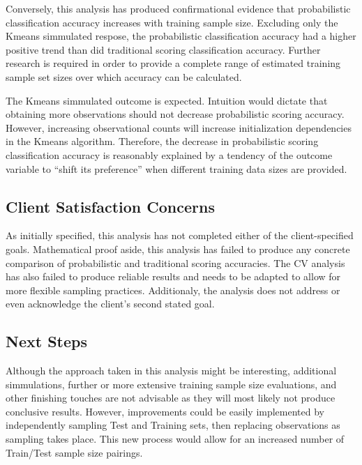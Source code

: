 \documentclass[12pt,]{article}
\begin{document}
Conversely, this analysis has produced confirmational evidence that
probabilistic classification accuracy increases with training sample
size. Excluding only the Kmeans simmulated respose, the probabilistic
classification accuracy had a higher positive trend than did traditional
scoring classification accuracy. Further research is required in order
to provide a complete range of estimated training sample set sizes over
which accuracy can be calculated.

The Kmeans simmulated outcome is expected. Intuition would dictate that
obtaining more observations should not decrease probabilistic scoring
accuracy. However, increasing observational counts will increase
initialization dependencies in the Kmeans algorithm. Therefore, the
decrease in probabilistic scoring classification accuracy is reasonably
explained by a tendency of the outcome variable to ``shift its
preference'' when different training data sizes are provided.

\hypertarget{client-satisfaction-concerns}{%
\subsection{Client Satisfaction
Concerns}\label{client-satisfaction-concerns}}

As initially specified, this analysis has not completed either of the
client-specified goals. Mathematical proof aside, this analysis has
failed to produce any concrete comparison of probabilistic and
traditional scoring accuracies. The CV analysis has also failed to
produce reliable results and needs to be adapted to allow for more
flexible sampling practices. Additionaly, the analysis does not address
or even acknowledge the client's second stated goal.

\hypertarget{next-steps}{%
\subsection{Next Steps}\label{next-steps}}

Although the approach taken in this analysis might be interesting,
additional simmulations, further or more extensive training sample size
evaluations, and other finishing touches are not advisable as they will
most likely not produce conclusive results. However, improvements could
be easily implemented by independently sampling Test and Training sets,
then replacing observations as sampling takes place. This new process
would allow for an increased number of Train/Test sample size pairings.
\end{document}
